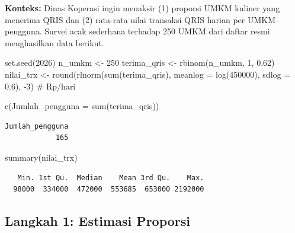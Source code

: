 \documentclass[
  indonesian,
  letterpaper,
]{book}
\newenvironment{Shaded}{\begin{snugshade}}{\end{snugshade}}
\newcommand{\AttributeTok}[1]{\textcolor[rgb]{0.40,0.45,0.13}{#1}}
\newcommand{\CommentTok}[1]{\textcolor[rgb]{0.37,0.37,0.37}{#1}}
\newcommand{\DecValTok}[1]{\textcolor[rgb]{0.68,0.00,0.00}{#1}}
\newcommand{\FloatTok}[1]{\textcolor[rgb]{0.68,0.00,0.00}{#1}}
\newcommand{\FunctionTok}[1]{\textcolor[rgb]{0.28,0.35,0.67}{#1}}
\newcommand{\NormalTok}[1]{\textcolor[rgb]{0.00,0.23,0.31}{#1}}
\newcommand{\OtherTok}[1]{\textcolor[rgb]{0.00,0.23,0.31}{#1}}
\newcommand{\SpecialCharTok}[1]{\textcolor[rgb]{0.37,0.37,0.37}{#1}}
\begin{document}
\textbf{Konteks:} Dinas Koperasi ingin menaksir (1) proporsi UMKM
kuliner yang menerima QRIS dan (2) rata-rata nilai transaksi QRIS harian
per UMKM pengguna. Survei acak sederhana terhadap 250 UMKM dari daftar
resmi menghasilkan data berikut.

\begin{Shaded}
\begin{Highlighting}[]
\FunctionTok{set.seed}\NormalTok{(}\DecValTok{2026}\NormalTok{)}
\NormalTok{n\_umkm }\OtherTok{\textless{}{-}} \DecValTok{250}
\NormalTok{terima\_qris }\OtherTok{\textless{}{-}} \FunctionTok{rbinom}\NormalTok{(n\_umkm, }\DecValTok{1}\NormalTok{, }\FloatTok{0.62}\NormalTok{)}
\NormalTok{nilai\_trx   }\OtherTok{\textless{}{-}} \FunctionTok{round}\NormalTok{(}\FunctionTok{rlnorm}\NormalTok{(}\FunctionTok{sum}\NormalTok{(terima\_qris), }\AttributeTok{meanlog =} \FunctionTok{log}\NormalTok{(}\DecValTok{450000}\NormalTok{), }\AttributeTok{sdlog =} \FloatTok{0.6}\NormalTok{), }\SpecialCharTok{{-}}\DecValTok{3}\NormalTok{)   }\CommentTok{\# Rp/hari}

\FunctionTok{c}\NormalTok{(}\AttributeTok{Jumlah\_pengguna =} \FunctionTok{sum}\NormalTok{(terima\_qris))}
\end{Highlighting}
\end{Shaded}

\begin{verbatim}
Jumlah_pengguna 
            165 
\end{verbatim}

\begin{Shaded}
\begin{Highlighting}[]
\FunctionTok{summary}\NormalTok{(nilai\_trx)}
\end{Highlighting}
\end{Shaded}

\begin{verbatim}
   Min. 1st Qu.  Median    Mean 3rd Qu.    Max. 
  98000  334000  472000  553685  653000 2192000 
\end{verbatim}

\subsection{Langkah 1: Estimasi
Proporsi}\label{langkah-1-estimasi-proporsi}
\end{document}
